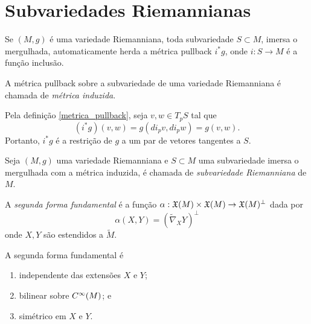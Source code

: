 \section{Subvariedades Riemannianas}

\begin{observacao}
	Se $(M,g)$ é uma variedade Riemanniana, toda subvariedade $S \subset M$, imersa o mergulhada, automaticamente herda a métrica pullback $i^* g$, onde $i: S \rightarrow M$ é a função inclusão.
\end{observacao}

\begin{definicao}\label{metrica_induzida}
	A métrica pullback sobre a subvariedade de uma variedade Riemanniana é chamada de \emph{métrica induzida}.
\end{definicao}

\begin{observacao}
	Pela definição \ref{metrica_pullback}, seja $v,w \in T_p S$ tal que
	\begin{equation*}
	(i^* g)(v,w) = g(di_p v, di_p w) = g(v,w). 
	\end{equation*}
	Portanto, $i^* g$ é a restrição de $g$ a um par de vetores tangentes a $S$. 
\end{observacao}

\begin{definicao}
	Seja $(M,g)$ uma variedade Riemanniana e $S \subset M$ uma subvariedade imersa o mergulhada com a métrica induzida, é chamada de \emph{subvariedade Riemanniana} de $M$.
\end{definicao}



\begin{definicao}
	A \emph{segunda forma fundamental} é a função $\alpha: \mathfrak{X}(M) \times \mathfrak{X}(M) \rightarrow \mathfrak{X}(M)^\perp$ dada por
	\begin{equation*}
		\alpha(X,Y) = (\tilde{\nabla}_X Y)^\perp
	\end{equation*} 
	onde $X,Y$ são estendidos a $\tilde{M}$.
\end{definicao}

\begin{lema}
	A segunda forma fundamental é
	\begin{enumerate}
		\item independente das extensões $X$ e $Y$;
		\item bilinear sobre $C^\infty(M)$; e
		\item simétrico em $X$ e $Y$.
	\end{enumerate}
\end{lema}

